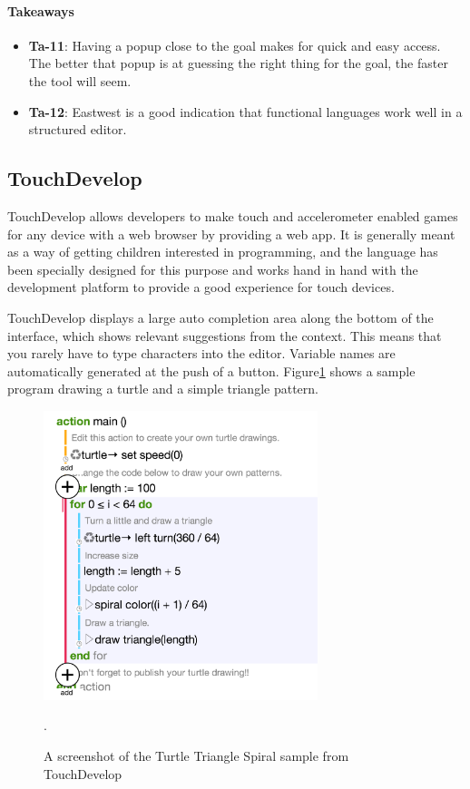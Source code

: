 \paragraph{Takeaways}
\begin{itemize}
	\item \textbf{Ta-11}: Having a popup close to the goal makes for quick and easy access. The better that popup is at guessing the right thing for the goal, the faster the tool will seem.
	\item \textbf{Ta-12}: Eastwest is a good indication that functional languages work well in a structured editor.
\end{itemize}


\subsection{TouchDevelop}
\label{subsub:TouchDevelop}
TouchDevelop allows developers to make touch and accelerometer enabled games for any device with a web browser by providing a web app. It is generally meant as a way of getting children interested in programming, and the language has been specially designed for this purpose and works hand in hand with the development platform to provide a good experience for touch devices.

TouchDevelop displays a large auto completion area along the bottom of the interface, which shows relevant suggestions from the context. 
This means that you rarely have to type characters into the editor. 
Variable names are automatically generated at the push of a button.
Figure\ref{fig:TouchDevelop_screenshot} shows a sample program drawing a
turtle and a simple triangle pattern.

\begin{figure}
	\centering
		\includegraphics[width=80mm]{diagrams/TouchDevelop_screenshot.png}
	\caption{A screenshot of the Turtle Triangle Spiral sample from
	TouchDevelop\,\cite{TouchDevelop:TurtleTriangleSpiral}}.
\label{fig:TouchDevelop_screenshot}
\end{figure}

